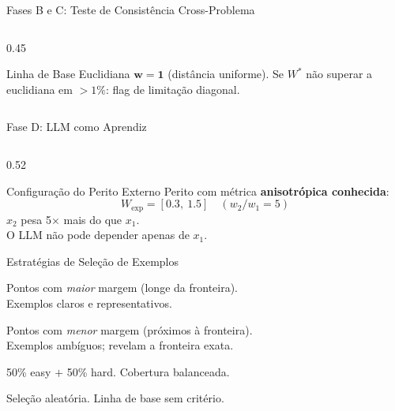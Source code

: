 \documentclass[aspectratio=169, 8pt]{beamer}
\begin{document}
\begin{frame}{Fases B e C: Teste de Consistência Cross-Problema}
\begin{columns}[T]
\begin{column}{0.45\textwidth}
      \vspace{0.1em}

      \begin{block}{Linha de Base Euclidiana}
        $\mathbf{w} = \mathbf{1}$ (distância uniforme).
        Se $W^*$ não superar a euclidiana em $>1\%$:
        flag de limitação diagonal.
      \end{block}
    \end{column}
  \end{columns}
\end{frame}

\begin{frame}{Fase D: LLM como Aprendiz}
  \begin{columns}[T]
    \begin{column}{0.52\textwidth}
      \begin{block}{Configuração do Perito Externo}
        Perito com métrica \textbf{anisotrópica conhecida}:
        \[
          W_{\text{exp}} = [0.3,\ 1.5] \quad (w_2 / w_1 = 5)
        \]
        $x_2$ pesa 5$\times$ mais do que $x_1$.\\
        O LLM não pode depender apenas de $x_1$.
      \end{block}

      \vspace{0.1em}

      \begin{block}{Estratégias de Seleção de Exemplos}
        \begin{description}
          \scriptsize
          \item[\textcolor{mygreen}{\textbf{Easy}}]
            Pontos com \emph{maior} margem (longe da fronteira).\\
            Exemplos claros e representativos.
          \item[\textcolor{myred}{\textbf{Hard}}]
            Pontos com \emph{menor} margem (próximos à fronteira).\\
            Exemplos ambíguos; revelam a fronteira exata.
          \item[\textcolor{myblue}{\textbf{Mixed}}]
            50\% easy $+$ 50\% hard. Cobertura balanceada.
          \item[\textcolor{mygray}{\textbf{Random}}]
            Seleção aleatória. Linha de base sem critério.
        \end{description}
      \end{block}
    \end{column}


\end{columns}
\end{frame}
\end{document}
